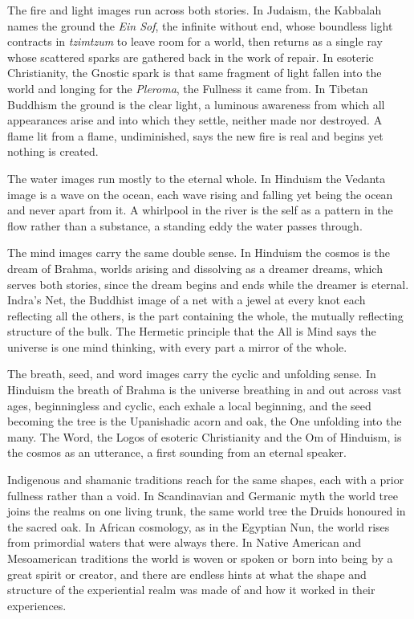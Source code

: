 The fire and light images run across both stories. In Judaism, the Kabbalah names the ground the \emph{Ein Sof},
the infinite without end, whose boundless light contracts in \emph{tzimtzum} to leave room for a world, then
returns as a single ray whose scattered sparks are gathered back in the work of repair. In esoteric Christianity,
the Gnostic spark is that same fragment of light fallen into the world and longing for the \emph{Pleroma}, the
Fullness it came from. In Tibetan Buddhism the ground is the clear light, a luminous awareness from which all
appearances arise and into which they settle, neither made nor destroyed. A flame lit from a flame, undiminished,
says the new fire is real and begins yet nothing is created.

The water images run mostly to the eternal whole. In Hinduism the Vedanta image is a wave on the ocean, each wave
rising and falling yet being the ocean and never apart from it. A whirlpool in the river is the self as a pattern
in the flow rather than a substance, a standing eddy the water passes through.

The mind images carry the same double sense. In Hinduism the cosmos is the dream of Brahma, worlds arising and
dissolving as a dreamer dreams, which serves both stories, since the dream begins and ends while the dreamer is
eternal. Indra's Net, the Buddhist image of a net with a jewel at every knot each reflecting all the others, is
the part containing the whole, the mutually reflecting structure of the bulk. The Hermetic principle that the All
is Mind says the universe is one mind thinking, with every part a mirror of the whole.

The breath, seed, and word images carry the cyclic and unfolding sense. In Hinduism the breath of Brahma is the
universe breathing in and out across vast ages, beginningless and cyclic, each exhale a local beginning, and the
seed becoming the tree is the Upanishadic acorn and oak, the One unfolding into the many. The Word, the Logos of
esoteric Christianity and the Om of Hinduism, is the cosmos as an utterance, a first sounding from an eternal
speaker.

Indigenous and shamanic traditions reach for the same shapes, each with a prior fullness rather than a void. In
Scandinavian and Germanic myth the world tree joins the realms on one living trunk, the same world tree
the Druids honoured in the sacred oak. In African cosmology, as in the Egyptian Nun, the world rises from
primordial waters that were always there. In Native American and Mesoamerican traditions the world is woven or
spoken or born into being by a great spirit or creator, and there are endless hints at what the shape and structure
of the experiential realm was made of and how it worked in their experiences.

